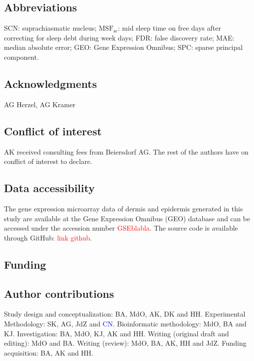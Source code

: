\subsection*{Abbreviations}
SCN: suprachiasmatic nucleus; $\textrm{MSF}_\textrm{sc}$: mid sleep time on free days after correcting for sleep debt during week days; FDR: false discovery rate; MAE: median absolute error; GEO: Gene Expression Omnibus; SPC: sparse principal component.

\subsection*{Acknowledgments}
AG Herzel, AG Kramer 

\subsection*{Conflict of interest}
AK received consulting fees from Beiersdorf AG. The rest of the authors have on conflict of interest to declare.


\subsection*{Data accessibility}
The gene expression microarray data of dermis and epidermis generated in this study are available at the Gene Expression Omnibus (GEO) database and can be accessed under the accession number \textcolor{red}{GSEblabla}. The source code is available through GitHub: \textcolor{red}{link github}. 

\subsection*{Funding}

\subsection*{Author contributions}
Study design and conceptualization: BA, MdO, AK, DK and HH. Experimental Methodology: SK, AG, JdZ and \textcolor{blue}{CN}. Bioinformatic methodology: MdO, BA and KJ. Investigation: BA, MdO, KJ, AK and HH. Writing (original draft and editing): MdO and BA. Writing (review): MdO, BA, AK, HH and JdZ. Funding acquisition: BA, AK and HH. 

